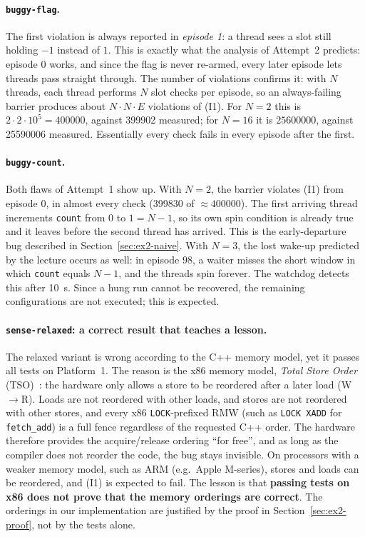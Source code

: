 \paragraph{\texttt{buggy-flag}.} The first violation is always reported in
\emph{episode 1}: a thread sees a slot still holding $-1$ instead of $1$.
This is exactly what the analysis of Attempt~2 predicts: episode $0$ works,
and since the flag is never re-armed, every later episode lets threads pass
straight through. The number of violations confirms it: with $N$ threads,
each thread performs $N$ slot checks per episode, so an always-failing
barrier produces about $N \cdot N \cdot E$ violations of (I1). For $N=2$
this is $2\cdot 2\cdot 10^5 = \num{400000}$, against \num{399902} measured;
for $N=16$ it is $\num{25600000}$, against \num{25590006} measured.
Essentially every check fails in every episode after the first.

\paragraph{\texttt{buggy-count}.} Both flaws of Attempt~1 show up. With
$N=2$, the barrier violates (I1) from episode $0$, in almost every check
(\num{399830} of $\approx\num{400000}$). The first arriving thread
increments \texttt{count} from $0$ to $1 = N-1$, so its own spin condition
is already true and it leaves before the second thread has arrived. This
is the early-departure bug described in Section~\ref{sec:ex2-naive}. With
$N=3$, the lost wake-up predicted by the lecture occurs as well: in
episode 98, a waiter misses the short window in which \texttt{count}
equals $N-1$, and the threads spin forever. The watchdog detects this
after \SI{10}{\second}. Since a hung run cannot be recovered, the remaining
configurations are not executed; this is expected.

\paragraph{\texttt{sense-relaxed}: a correct result that teaches a lesson.}
The relaxed variant is wrong according to the C++ memory model, yet it
passes all tests on Platform~1. The reason is the x86 memory model,
\emph{Total Store Order} (TSO)~\cite{sorin2020}: the hardware only allows
a store to be reordered after a later load (W$\to$R). Loads are not
reordered with other loads, and stores are not reordered with other stores,
and every x86 \texttt{LOCK}-prefixed RMW (such as \texttt{LOCK XADD} for
\texttt{fetch\_add}) is a full fence regardless of the requested C++ order.
The hardware therefore provides the acquire/release ordering ``for free'',
and as long as the compiler does not reorder the code, the bug stays
invisible. On processors with a weaker memory model, such as ARM (e.g.\
Apple M-series), stores and loads can be reordered, and (I1) is expected
to fail. The lesson is that \textbf{passing tests on x86 does not prove that
the memory orderings are correct}. The orderings in our implementation are
justified by the proof in Section~\ref{sec:ex2-proof}, not by the tests
alone.

